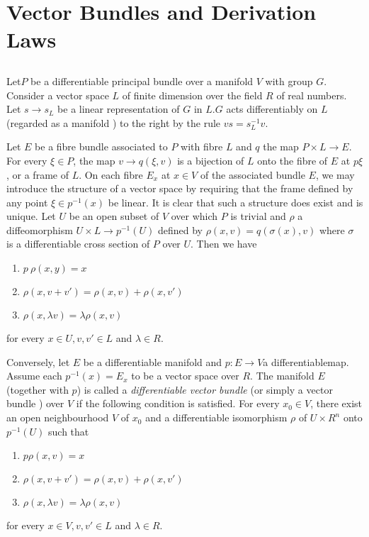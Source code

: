 
\chapter{Vector Bundles and Derivation Laws}\label{chap5}

\section{}\label{chap5:sec1}%

Let\pageoriginale $P$ be a differentiable principal bundle over a manifold $V$ with
group $G$. Consider a vector space $L$ of finite dimension over the
field $R$ of real numbers. Let $s \to s_L$ be a linear representation
of $G$ in $L.G$ acts differentiably on $L$ (regarded as a manifold )
to the right by the rule $vs = s^{-1}_L v$. 

Let $E$ be a fibre bundle associated to $P$ with fibre $L$ and $q$ the
map $ P \times L \to E$. For every $\xi \in P$, the map $v \to q(\xi,
v)$ is a bijection of $L$ onto the fibre of $E$ at $p \xi$, or a frame
of $L$. 
On each fibre $E_x$ at $x \in V$ of the associated bundle $E$, we may
introduce the structure of a vector space by requiring that the frame
defined by any point $\xi \in p^{-1}(x) $ be linear. It is clear that
such a structure does exist and is unique. Let $U$ be an open subset
of $V$ over which $P$ is trivial and $\rho$ a diffeomorphism $U \times
L \to p^{-1}(U)$ defined by $\rho(x, v) = q(\sigma(x) ,v)$ where
$\sigma$ is a differentiable cross section of $P$ over $U$. Then we
have  
\begin{enumerate}[1)]
\item $p ~\rho (x,y) =x$
\item $\rho (x,v+v') = \rho (x,v) + \rho (x,v')$
\item $\rho (x , \lambda v) = \lambda \rho (x,v)$
\end{enumerate} 
for every $x \in U, v, v' \in L$ and $\lambda \in R$.

Conversely, let $E$ be a differentiable manifold and $p: E \to V$a
differentiable\pageoriginale map. Assume each $p^{-1}(x) = E_x$ to be a vector space
over $R$. The manifold $E$ (together with $p$) is called a \textit{
  differentiable vector bundle} (or simply a vector bundle ) over $V$
if the following  condition is satisfied. For every $x_0 \in V$, there
exist an open neighbourhood $V$ of $x_0$ and a differentiable
isomorphism $\rho$ of $U \times R^n$ onto $p^{-1} (U)$ such that  
\begin{enumerate}[1)]
\item $p \rho (x,v) =x$
\item $\rho (x,v + v') = \rho (x ,v) + \rho (x,v')$
\item $\rho (x, \lambda v) = \lambda \rho (x,v)$
\end{enumerate}
for every $x \in V, v, v' \in L$ and $\lambda \in R$.

